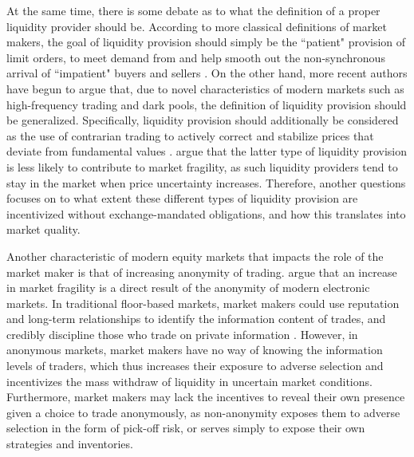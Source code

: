 \documentclass{article}
\begin{document}
At the same time, there is some debate as to what the definition of a proper liquidity provider should be. According to more classical definitions of market makers, the goal of liquidity provision should simply be the ``patient" provision of limit orders, to meet demand from and help smooth out the non-synchronous arrival of ``impatient" buyers and sellers \citep[see, e.g.,][]{grossman1988liquidity}. On the other hand, more recent authors have begun to argue that, due to novel characteristics of modern markets such as high-frequency trading and dark pools, the definition of liquidity provision should be generalized. Specifically, liquidity provision should additionally be considered as the use of contrarian trading to actively correct and stabilize prices that deviate from fundamental values \citep[see, e.g.,][]{Hendershott2014405}. \citet{biais2016supplies} argue that the latter type of liquidity provision is less likely to contribute to market fragility, as such liquidity providers tend to stay in the market when price uncertainty increases. Therefore, another questions focuses on to what extent these different types of liquidity provision are incentivized without exchange-mandated obligations, and how this translates into market quality.


\noindent Another characteristic of modern equity markets that impacts the role of the market maker is that of increasing anonymity of trading. \citet{raman2014electronic} argue that an increase in market fragility is a direct result of the anonymity of modern electronic markets. In traditional floor-based markets, market makers could use reputation and long-term relationships to identify the information content of trades, and credibly discipline those who trade on private information \citep{battalio2007reputation}. However, in anonymous markets, market makers have no way of knowing the information levels of traders, which thus increases their exposure to adverse selection and incentivizes the mass withdraw of liquidity in uncertain market conditions. Furthermore, market makers may lack the incentives to reveal their own presence given a choice to trade anonymously, as non-anonymity exposes them to adverse selection in the form of pick-off risk, or serves simply to expose their own strategies and inventories.


\end{document}
